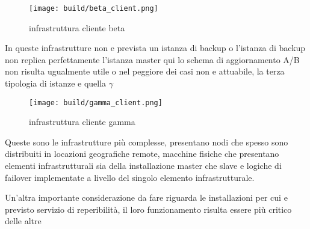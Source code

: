 \begin{figure}[H]
    \centering
    \texttt{[image: build/beta\_client.png]}
    \caption{infrastruttura cliente beta}
    \label{fig:enter-label}
\end{figure}

In queste infrastrutture non e prevista un istanza di backup o l'istanza di backup non replica perfettamente l'istanza master qui lo schema di aggiornamento A/B non risulta ugualmente utile o nel peggiore dei casi non e attuabile, la terza tipologia di istanze e quella \(\gamma\)


\begin{figure}[H]
    \centering
    \texttt{[image: build/gamma\_client.png]}
    \caption{infrastruttura cliente gamma}
    \label{fig:enter-label}
\end{figure}

Queste sono le infrastrutture più complesse, presentano nodi che spesso sono distribuiti in locazioni geografiche remote, macchine fisiche che presentano elementi infrastrutturali sia della installazione master che slave e logiche di failover implementate a livello del singolo elemento infrastrutturale.

Un'altra importante considerazione da fare riguarda le installazioni per cui e previsto servizio di reperibilità, il loro funzionamento risulta essere più critico delle altre



